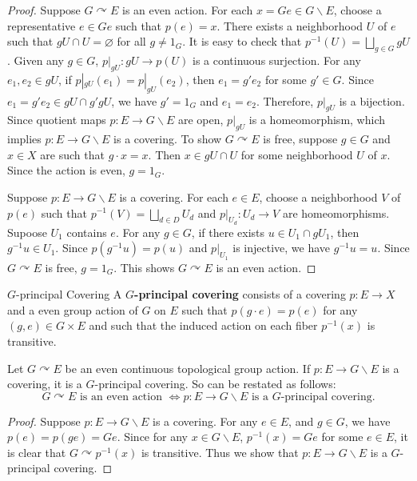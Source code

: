 \documentclass{report}
\def\acts{\curvearrowright}
\begin{document}
\begin{proof}
	Suppose $G \acts E$ is an even action. For each $x=Ge \in G \backslash E$, choose a representative $e \in Ge$ such that $p(e)=x$. There exists a neighborhood $U$ of $e$ such that $gU \cap U = \varnothing$ for all $g \neq 1_G$. It is easy to check that $p^{-1}(U)=\bigsqcup_{g\in G} gU$. Given any $g\in G$, $p|_{gU}: gU \to p(U)$ is a continuous surjection. For any $e_1,e_2\in gU$, if $p|_{gU}(e_1)=p|_{gU}(e_2)$, then $e_1=g'e_2$ for some $g'\in G$. Since $e_1=g'e_2\in gU \cap g'gU$, we have $g'=1_G$ and $e_1=e_2$. Therefore, $p|_{gU}$ is a bijection. Since quotient maps $p: E\to G\backslash E$ are open, $p|_{gU}$ is a homeomorphism, which implies $p: E\to G\backslash E$ is a covering. To show $G \acts E$ is free, suppose $g \in G$ and $x \in X$ are such that $g \cdot x=x$. Then $x \in g U \cap U$ for some neighborhood $U$ of $x$. Since the action is even, $g=1_G$.

	Suppose $p: E\to G\backslash E$ is a covering. For each $e\in E$, choose a neighborhood $V$ of $p(e)$ such that $p^{-1}\left(V\right)=\bigsqcup_{d\in D} U_d$ and $p|_{U_d}: U_d\to V$ are homeomorphisms. Supoose $U_1$ contains $e$. For any $g\in G$, if there exists $u \in U_1 \cap gU_1$, then $g^{-1}u \in U_1$. Since $p(g^{-1}u)=p(u)$ and $p|_{U_1}$ is injective, we have $g^{-1}u=u$. Since $G \acts E$ is free, $g=1_G$. This shows $G \acts E$ is an even action.
\end{proof}


\begin{definition}{$G$-principal Covering}{}
	A \textbf{$G$-principal covering} consists of a covering $p: E \rightarrow X$ and a even group action of $G$ on $E$ such that $p(g \cdot e)=p(e)$ for any $(g, e) \in G \times E$ and such that the induced action on each fiber $p^{-1}(x)$ is transitive.
\end{definition}
\begin{proposition}{}{}
	Let $G\acts E$ be an even continuous topological group action. If $p: E\to G\backslash E$ is a covering, it is a $G$-principal covering. So  can be restated as follows:
	\[ 
	G \acts E\text{ is an even action }\iff p: E\to G\backslash E \text{ is a $G$-principal covering}.
	\]
\end{proposition}
\begin{proof}
	Suppose $p: E\to G\backslash E$ is a covering. For any $e\in E$, and $g\in G$, we have $p(e)=p(ge)=Ge$. Since for any $x\in G \backslash E$, $p^{-1}(x)=Ge$ for some $e\in E$, it is clear that $G \acts p^{-1}(x)$ is transitive. Thus we show that $p: E\to G\backslash E$ is a $G$-principal covering.
\end{proof}
\end{document}
